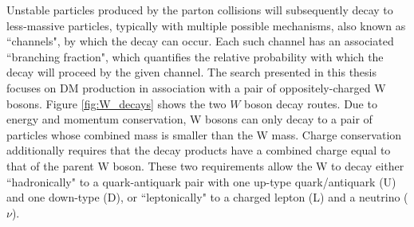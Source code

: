 Unstable particles produced by the parton collisions will subsequently decay to less-massive particles, typically with multiple possible mechanisms, also known as ``channels", by which the decay can occur. Each such channel has an associated ``branching fraction", which quantifies the relative probability with which the decay will proceed by the given channel. The search presented in this thesis focuses on DM production in association with a pair of oppositely-charged W bosons. Figure \ref{fig:W_decays} shows the two \(W\) boson decay routes. Due to energy and momentum conservation, W bosons can only decay to a pair of particles whose combined mass is smaller than the W mass. Charge conservation additionally requires that the decay products have a combined charge equal to that of the parent W boson. These two requirements allow the W to decay either ``hadronically" to a quark-antiquark pair with one up-type quark/antiquark (U) and one down-type (D), or ``leptonically" to a charged lepton (L) and a neutrino (\(\nu\)).

